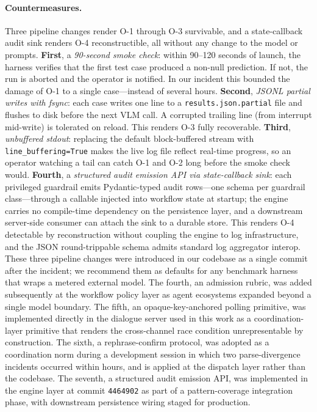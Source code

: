 \paragraph{Countermeasures.}
Three pipeline changes render O-1 through O-3 survivable, and a
state-callback audit sink renders O-4 reconstructible, all without
any change to the model or prompts.
\textbf{First}, a \emph{90-second smoke check}: within 90--120 seconds
of launch, the harness verifies that the first test case produced a
non-null prediction.  If not, the run is aborted and the operator is
notified.  In our incident this bounded the damage of O-1 to a single
case---instead of several hours.
\textbf{Second}, \emph{JSONL partial writes with fsync}: each case
writes one line to a \texttt{results.json.partial} file and flushes
to disk before the next VLM call.  A corrupted trailing line (from
interrupt mid-write) is tolerated on reload.  This renders O-3
fully recoverable.
\textbf{Third}, \emph{unbuffered stdout}: replacing the default
block-buffered stream with \texttt{line\_buffering=True} makes the
live log file reflect real-time progress, so an operator watching a
tail can catch O-1 and O-2 long before the smoke check would.
\textbf{Fourth}, a \emph{structured audit emission API via
state-callback sink}: each privileged guardrail emits Pydantic-typed
audit rows---one schema per guardrail class---through a callable
injected into workflow state at startup; the engine carries no
compile-time dependency on the persistence layer, and a
downstream server-side consumer can attach the sink to a durable
store.  This renders O-4
detectable by reconstruction without coupling the engine to log
infrastructure, and the JSON round-trippable schema admits standard
log aggregator interop.
These three pipeline changes were introduced in our codebase as a
single commit after the incident; we recommend them as defaults for
any benchmark harness that wraps a metered external model.  The
fourth, an admission rubric, was added subsequently at the workflow
policy layer as agent ecosystems expanded beyond a single model
boundary.  The fifth, an opaque-key-anchored polling primitive, was
implemented directly in the dialogue server used in this work as a
coordination-layer primitive that renders the cross-channel race
condition unrepresentable by construction.  The sixth, a
rephrase-confirm protocol, was adopted as a coordination norm
during a development session in which two parse-divergence
incidents occurred within hours, and is applied at the dispatch
layer rather than the codebase.  The seventh, a structured audit
emission API, was implemented in the engine layer at commit
\texttt{4464902} as part of a pattern-coverage integration phase,
with downstream persistence wiring staged for production.

